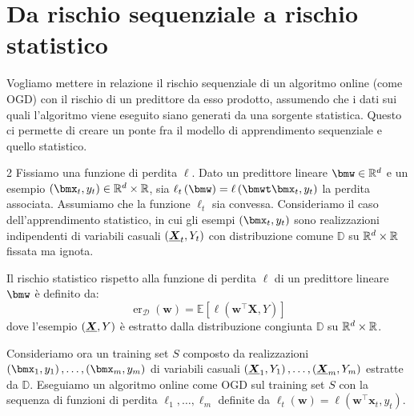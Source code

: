 \documentclass[\main/main.tex]{subfiles}
\begin{document}
\chapter{Da rischio sequenziale a rischio statistico}
\begin{goal}
    Vogliamo mettere in relazione il rischio sequenziale di un algoritmo online (come OGD) con il rischio di un predittore da esso prodotto, assumendo che i dati sui quali l'algoritmo viene eseguito siano generati da una sorgente statistica. Questo ci permette di creare un ponte fra il modello di apprendimento sequenziale e quello statistico.
\end{goal}
\begin{analysis}
    \begin{multicols}{2}
        Fissiamo una funzione di perdita \(\ell\). Dato un predittore lineare \(\bmw \in \R^d\) e un esempio \(\rnd{\bmx_t, y_t} \in \R^d\times\R\), sia \(\ell_t\rnd{\bmw} = \loss{\bmwt\bmx_t}{y_t}\) la perdita associata. Assumiamo che la funzione \(\ell_t\) sia convessa.
        Consideriamo il caso dell'apprendimento statistico, in cui gli esempi \(\rnd{\bmx_t, y_t}\) sono realizzazioni indipendenti di variabili casuali \(\rnd{\bm{X}_t, Y_t}\) con distribuzione comune \(\mathbb{D}\) su \(\mathbb{R}^d\times\mathbb{R}\) fissata ma ignota.
    
        Il rischio statistico rispetto alla funzione di perdita \(\ell\) di un predittore lineare \(\bmw\) è definito da:
        \[\operatorname{er}_{\mathcal{D}}(\boldsymbol{w})=\mathbb{E}\left[\ell\left(\boldsymbol{w}^{\top} \boldsymbol{X}, Y\right)\right]\]
        dove l'esempio \(\rnd{\bm{X}, Y}\) è estratto dalla distribuzione congiunta \(\mathbb{D}\) su \(\mathbb{R}^d\times \mathbb{R}\).
        
        Consideriamo ora un training set \(S\) composto da realizzazioni \(\examples{m}\) di variabili casuali \(\rnd{\bm{X}_1, Y_1},\ldots,\rnd{\bm{X}_m, Y_m}\) estratte da \(\mathbb{D}\). Eseguiamo un algoritmo online come OGD sul training set \(S\) con la sequenza di funzioni di perdita \(\ell_1, \ldots, \ell_m\) definite da \(\ell_{t}(\boldsymbol{w})=\ell\left(\boldsymbol{w}^{\top} \boldsymbol{x}_{t}, y_{t}\right)\). 
        

\end{multicols}
\end{analysis}
\end{document}

